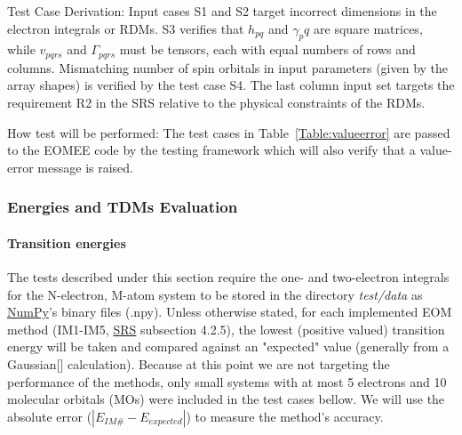 \documentclass[12pt, titlepage]{article}
\begin{document}
\begin{enumerate}
Test Case Derivation: Input cases S1 and S2 target incorrect dimensions in the 
electron integrals or RDMs. S3 verifies that $h_{pq}$ and $\gamma_pq$ are 
square matrices, while $v_{pqrs}$ and $\Gamma_{pqrs}$ must be tensors, each 
with equal numbers of rows and columns. Mismatching number of spin orbitals in 
input parameters (given by the array shapes) is verified by the test case S4. 
The last column input set targets the requirement R2 in the SRS relative to the 
physical constraints of the RDMs.

How test will be performed: The test cases in Table~\ref{Table:valueerror} are 
passed to the EOMEE code by the testing framework which will also verify that a 
value-error message is raised.

\end{enumerate}

\subsubsection{Energies and TDMs Evaluation}
\label{section:calculations}

\paragraph{Transition energies\\}

The tests described under this section require the one- and 
two-electron integrals for the N-electron, M-atom system to be stored in the 
directory \textit{test/data} as \href{https://numpy.org/} {NumPy}'s binary 
files (.npy). Unless otherwise 
stated, for each implemented EOM method (IM1-IM5, 
\href{https://github.com/gabrielasd/eomee/tree/cas741/docs/SRS} {SRS} 
subsection 4.2.5), the lowest (positive valued) 
transition energy will be taken and compared against an "expected" value 
(generally from a Gaussian[\cite{g16}] calculation). 
Because at this point we are not targeting the performance of the 
methods, only small systems with at most 5 electrons and 10 molecular orbitals 
(MOs) 
were included in the test cases bellow. We will use the absolute error 
($|E_{IM\#} - E_{expected}|$) to measure the method's accuracy.
\end{document}
